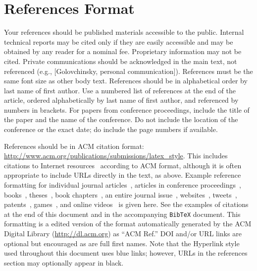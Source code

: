 \documentclass{ciis}
\begin{document}
\section{References Format}
Your references should be published materials accessible to the
public. Internal technical reports may be cited only if they are
easily accessible and may be obtained by any reader for a nominal
fee. Proprietary information may not be cited. Private communications
should be acknowledged in the main text, not referenced (e.g.,
[Golovchinsky, personal communication]). References must be the same
font size as other body text. References should be in alphabetical
order by last name of first author. Use a numbered list of references
at the end of the article, ordered alphabetically by last name of
first author, and referenced by numbers in brackets. For papers from
conference proceedings, include the title of the paper and the name of
the conference. Do not include the location of the conference or the
exact date; do include the page numbers if available. 

References should be in ACM citation format:
\url{http://www.acm.org/publications/submissions/latex_style}.  This
includes citations to Internet
resources~\cite{CHINOSAUR:venue,cavender:writing,psy:gangnam}
according to ACM format, although it is often appropriate to include
URLs directly in the text, as above. Example reference formatting for
individual journal articles~\cite{ethics}, articles in conference
proceedings~\cite{Klemmer:2002:WSC:503376.503378},
books~\cite{Schwartz:1995:GBF}, theses~\cite{sutherland:sketchpad},
book chapters~\cite{winner:politics}, an entire journal
issue~\cite{kaye:puc},
websites~\cite{acm_categories,cavender:writing},
tweets~\cite{CHINOSAUR:venue}, patents~\cite{heilig:sensorama}, 
games~\cite{supermetroid:snes}, and
online videos~\cite{psy:gangnam} is given here.  See the examples of
citations at the end of this document and in the accompanying
\texttt{BibTeX} document. This formatting is a edited version of the
format automatically generated by the ACM Digital Library
(\url{http://dl.acm.org}) as ``ACM Ref.'' DOI and/or URL links are
optional but encouraged as are full first names. Note that the
Hyperlink style used throughout this document uses blue links;
however, URLs in the references section may optionally appear in
black.

\balance{}



\end{document}
